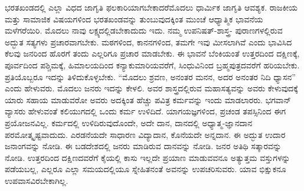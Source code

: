 ಭರತಖಂಡದಲ್ಲಿ ಎಲ್ಲಾ ವಿಧದ ಜಾಗೃತಿ ಫಲಕಾರಿಯಾಗಬೇಕಾದರೆ\break ಮೊದಲು ಧಾರ್ಮಿಕ ಜಾಗೃತಿ ಆವಶ್ಯಕ. ರಾಜಕೀಯ ಮತ್ತು ಸಾಮಾಜಿಕ ವಿಷಯಗಳಿಂದ ಭರತಖಂಡವನ್ನು ತುಂಬುವುದಕ್ಕಿಂತ ಮುಂಚೆ ಆಧ್ಯಾತ್ಮಿಕ ಭಾವನೆಯ ಮಳೆಗರೆಯಿರಿ. ಮೊದಲು ನಾವು ಲಕ್ಷ್ಯದಲ್ಲಿಡಬೇಕಾದುದು ಇದು. ನಮ್ಮ ಉಪನಿಷತ್​-ಶಾಸ್ತ್ರ- ಪುರಾಣಗಳಲ್ಲಿರುವ ಅದ್ಭುತ ಸತ್ಯಗಳು ಪ್ರಚಾರವಾಗಬೇಕು. ಮಠಗಳಿಂದ, ಕಾನನಗಳಿಂದ, ತಮಗೇ ಇವು ಮೀಸಲಾಗಿವೆ ಎಂದು ಭಾವಿಸಿದ ಕೆಲವು ಜನರಿಂದ ಹೊರಗೆ ತಂದು ಎಲ್ಲರಿಗೂ ಪ್ರಚಾರ ಮಾಡಬೇಕು. ಈ ಭಾವನೆ ಬೆಂಕಿಯಂತೆ ಉತ್ತರದಿಂದ ದಕ್ಷಿಣಕ್ಕೆ, ಪೂರ್ವದಿಂದ ಪಶ್ಚಿಮಕ್ಕೆ, ಹಿಮಾಲಯದಿಂದ ಕನ್ಯಾಕುಮಾರಿಯವರೆಗೆ, ಸಿಂಧುವಿನಿಂದ ಬ್ರಹ್ಮಪುತ್ರದವರೆಗೆ ಹರಿಯಬೇಕು. ಪ್ರತಿಯೊಬ್ಬರೂ ಇದನ್ನು ತಿಳಿದುಕೊಳ್ಳಬೇಕು. “ಮೊದಲು ಶ್ರವಣ, ಅನಂತರ ಮನನ, ಅದರ ಅನಂತರ ನಿದಿ ಧ್ಯಾಸನ” ಎಂದು ಹೇಳುವರು. ಮೊದಲು ಜನರು ಇದನ್ನು ಕೇಳಲಿ. ಅವರ ಶಾಸ್ತ್ರದಲ್ಲಿರುವ ಮಹಾಸತ್ಯವನ್ನು ಅವರು ಕೇಳುವುದಕ್ಕೆ ಯಾರು ಸಹಾಯ ಮಾಡುವರೋ ಅವರು ಅದಕ್ಕಿಂತ ಹೆಚ್ಚು ಪವಿತ್ರ ಕರ್ಮವನ್ನು ಇಂದು ಮಾಡಲಾರರು. ಭಗವಾನ್​ ವ್ಯಾಸರು ಹೇಳುವಂತೆ ಕಲಿಯುಗದಲ್ಲಿ ಒಂದು ಕರ್ಮ ಉಳಿದಿದೆ. ಯಾಗಯಜ್ಞಗಳಿಂದ, ಪ್ರಚಂಡ ತಪಸ್ಸಿನಿಂದ ಈಗ ಪ್ರಯೋಜನವಿಲ್ಲ. ಕರ್ಮದಲ್ಲಿ ಉಳಿದಿರುವುದೊಂದೇ, ಅದೇ ದಾನ, ದಾನದಲ್ಲಿ ಅಧ್ಯಾತ್ಮ-ಜ್ಞಾನದಾನ ಪರಮೋತ್ಕೃಷ್ಟವಾದುದು. ಎರಡನೆಯದೇ ಸಾಧಾರಣ ವಿದ್ಯಾದಾನ, ಕೊನೆಯದೇ ಅನ್ನದಾನ. ಈ ಅದ್ಭುತ ಉದಾರ ಜನಾಂಗವನ್ನು ನೋಡಿ. ಈ ಬಡದೇಶದಲ್ಲಿ ಜನರು ಮಾಡಿರುವ ದಾನವನ್ನು ನೋಡಿ. ಜನರ ಅತಿಥಿ ಸತ್ಕಾರವನ್ನು ನೋಡಿ. ಉತ್ತರದಿಂದ ದಕ್ಷಿಣದವರೆಗೆ ಕೈಯಲ್ಲಿ ಕಾಸು ಇಲ್ಲದೇ ಪ್ರಯಾಣ ಮಾಡುವವನೂ ಅತ್ಯುತ್ತಮ ವಸ್ತುಗಳನ್ನು ಪಡೆಯಬಲ್ಲ, ಎಲ್ಲರೂ ಎಲ್ಲಾ ಸಮಯದಲ್ಲಿಯೂ ಸ್ನೇಹಿತನಂತೆ ಅವನನ್ನು ಉಪಚರಿಸುವರು. ಯಾವ ಭಿಕ್ಷುಕನೂ ಉಪವಾಸವಿರಬೇಕಾಗಿಲ್ಲ.

